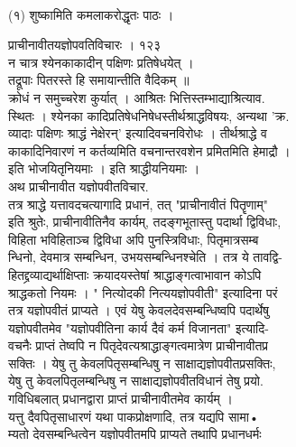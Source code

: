 \documentclass[11pt, openany]{book}
\begin{document}
{{{{{{{{{{{%

{\\
(१) शुष्कामिति कमलाकरोद्धृतः पाठः ।

{ }{प्राचीनावीतयज्ञोपवतिविचारः । १२३}{\\
न चात्र श्येनकाकादीन् पक्षिणः प्रतिषेधयेत् ।\\
तद्रूपाः पितरस्ते हि समायान्तीति वैदिकम् ॥\\
क्रोधं न समुच्चरेश कुर्यात् । आश्रितः भित्तिस्तम्भाद्याश्रित्याव.\\
स्थितः । श्येनका कादिप्रतिषेधनिषेधस्तीर्थश्राद्धविषयः, अन्यथा 'क्र.\\
व्यादाः पक्षिणः श्राद्धं नेक्षेरन्' इत्यादिवचनविरोधः । तीर्थश्राद्धे व\\
काकादिनिवारणं न कर्तव्यमिति वचनान्तरवशेन प्रमितमिति हेमाद्रौ ।\\
इति भोजयितृनियमाः । इति श्राद्धीयनियमाः ।\\
अथ प्राचीनावीत यज्ञोपवीतविचार. \textbar{}\\
तत्र श्राद्धे यत्तावदचत्यागादि प्रधानं, तत् "प्राचीनावीतं पितॄणाम्"\\
इति श्रुतेः, प्राचीनावीतिनैव कार्यम्, तदङ्गभूतास्तु पदार्था द्विविधाः,\\
विहिता भविहिताञ्च द्विविधा अपि पुनस्त्रिविधाः, पितृमात्रसम्ब\\
न्धिनो, देवमात्र सम्बन्धिन, उभयसम्बन्धिनश्चेति । तत्र ये तावद्वि-\\
हितद्द्रव्याद्यर्थाक्षिप्ताः क्रयादयस्तेषां श्राद्धाङ्गत्वाभावान कोऽपि\\
श्राद्धकतो नियमः । " नित्योदकी नित्ययज्ञोपवीती" इत्यादिना परं\\
तत्र यज्ञोपवीतं प्राप्यते । एवं येषु केवलदेवसम्बन्धिष्वपि पदार्थेषु\\
यज्ञोपवीतमेव "यज्ञोपवीतिना कार्य दैवं कर्म विजानता" इत्यादि-\\
वचनैः प्राप्तं तेष्वपि न पितृदेवत्यश्राद्धाङ्गत्वमात्रेण
प्राचीनावीतप्र\\
सक्तिः । येषु तु केवलपितृसम्बन्धिषु न साक्षाद्यज्ञोपवीतप्रसक्तिः,\\
येषु तु केवलपितृलम्बन्धिषु न साक्षाद्यज्ञोपवीतविधानं तेषु प्रयो.\\
गविधिबलात् प्रधानद्वारा प्राप्तं प्राचीनावीतमेव कार्यम् ।\\
यत्तु दैवपितृसाधारणं यथा पाकप्रोक्षणादि, तत्र यद्यपि सामा•\\
म्यतो देवसम्बन्धित्वेन यज्ञोपवीतमपि प्राप्यते तथापि प्रधानधर्मः\\
}}}}}}}}}}}}}
\end{document}
